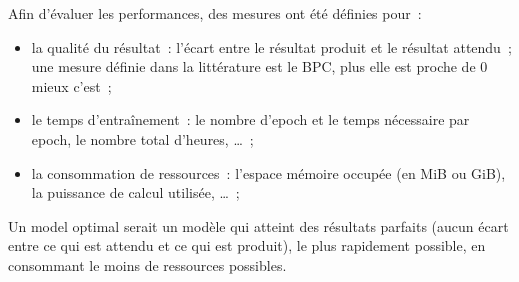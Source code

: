 Afin d'évaluer les performances, des mesures ont été définies pour~:
\begin{itemize}
	\item la qualité du résultat~:  l'écart entre le résultat produit et le résultat attendu~; une mesure définie dans la littérature est le BPC, plus elle est proche de 0 mieux c'est~;
	\item le temps d'entraînement~:  le nombre d'\gls{epoch} et le temps nécessaire par \gls{epoch}, le nombre total d'heures, \dots~;
	\item la consommation de ressources~:  l'espace mémoire occupée (en MiB ou GiB), la puissance de calcul utilisée, \dots~;
\end{itemize}
\vspace{1em}

Un \gls{model} optimal serait un modèle qui atteint des résultats parfaits (aucun écart entre ce qui est attendu et ce qui est produit), le plus rapidement possible, en consommant le moins de ressources possibles.

